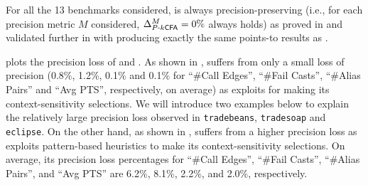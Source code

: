 For all the 13 benchmarks considered,
 is always precision-preserving (i.e., for each precision metric $M$ considered, $\Delta_{\textsf{$P$-$k$CFA}}^{M} = 0\%$ always holds)  as proved in
 and validated further in  with
 producing exactly the same points-to results as .

 plots the precision loss of  and .
As shown in ,
  suffers from only a small loss of precision (0.8\%, 1.2\%, 0.1\% and 0.1\% for ``\#Call Edges'', ``\#Fail Casts'', ``\#Alias Pairs'' and ``Avg PTS'', respectively, on average) as \selectx exploits \manuLFC \cite{sridharan2006refinement} for making its context-sensitivity selections. We will  introduce two examples below to explain the relatively large precision loss observed in \texttt{tradebeans}, \texttt{tradesoap}  and
 \texttt{eclipse}. 
 On the  other hand, as shown in ,
   suffers from a higher  precision loss as \zipper exploits pattern-based 
 heuristics to make its context-sensitivity selections. On average, its precision loss percentages for ``\#Call Edges'', ``\#Fail Casts'', ``\#Alias Pairs'', and ``Avg PTS'' are 6.2\%, 8.1\%, 2.2\%, and 2.0\%, respectively.

